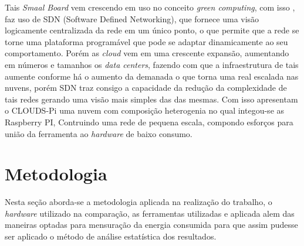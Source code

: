 \documentclass[12pt]{article}
\begin{document}
  Tais \textit{Smaal Board} vem crescendo em uso no conceito \textit{green computing}, com isso \cite{2018CLOUDSPiA}, faz uso de SDN (Software Defined Networking), que fornece uma visão logicamente centralizada da rede em um único ponto, o que permite que a rede se torne uma plataforma programável que pode se adaptar dinamicamente ao seu comportamento. Porém as \textit{cloud} vem em uma crescente expansão, aumentando em números e tamanhos os \textit{data centers}, fazendo com que a infraestrutura de tais aumente conforme há o aumento da demanada o que torna uma real escalada nas nuvens, porém SDN traz consigo a capacidade da redução da complexidade de tais redes gerando uma visão mais simples das das mesmas. Com isso apresentam o CLOUDS-Pi uma nuvem com composição heterogenia no qual integou-se as Raspberry PI, Contruindo uma rede de pequena escala, compondo esforços para união da ferramenta ao \textit{hardware} de baixo consumo.\\    
  
\section{Metodologia} \label{sec:metodologia}
  Nesta seção aborda-se a metodologia aplicada na realização do trabalho, o \textit{hardware} utilizado na comparação, as ferramentas utilizadas e aplicada alem das maneiras optadas para mensuração da energia consumida para que assim pudesse ser aplicado o método de análise estatística dos resultados.
\end{document}
